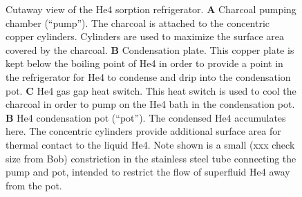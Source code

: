 \documentclass[10pt,twocolumn,article]{memoir}
\newcommand{\He}[1]{He#1\xspace}
\begin{document}
\begin{figure}[th]
\centering
{}
\caption{Cutaway view of the \He4 sorption refrigerator. \textbf{A} Charcoal pumping chamber (``pump''). The charcoal is attached to the concentric copper cylinders. Cylinders are used to maximize the surface area covered by the charcoal. \textbf{B} Condensation plate. This copper plate is kept below the boiling point of \He4 in order to provide a point in the refrigerator for \He4 to condense and drip into the condensation pot. \textbf{C} \He4 gas gap heat switch. This heat switch is used to cool the charcoal in order to pump on the \He4 bath in the condensation pot. \textbf{B} \He4 condensation pot (``pot''). The condensed \He4 accumulates here. The concentric cylinders provide additional surface area for thermal contact to the liquid \He4. Note shown is a small (xxx check size from Bob) constriction in the stainless steel tube connecting the pump and pot, intended to restrict the flow of superfluid \He4 away from the pot.}
\label{fig:he4sorp}
\end{figure}
\end{document}
